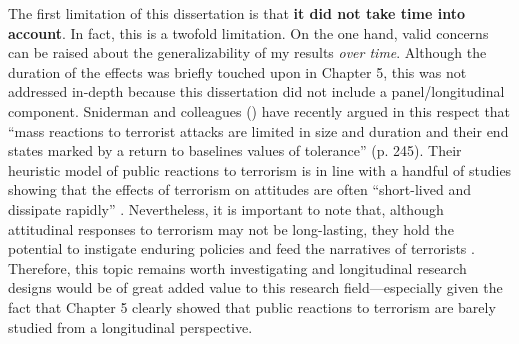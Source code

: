 The first limitation of this dissertation is that \textbf{it did not take time into account}. In fact, this is a twofold limitation. On the one hand, valid concerns can be raised about the generalizability of my results \textit{over time}. Although the duration of the effects was briefly touched upon in Chapter 5, this was not addressed in-depth because this dissertation did not include a panel/longitudinal component. Sniderman and colleagues (\citeyear{Sniderman2019a}) have recently argued in this respect that ``mass reactions to terrorist attacks are limited in size and duration and their end states marked by a return to baselines values of tolerance'' (p. 245). Their heuristic model of public reactions to terrorism is in line with a handful of studies showing that the effects of terrorism on attitudes are often ``short-lived and dissipate rapidly'' \citep[p.~231; see also Dinesen et al., \citeyear{Dinesen2013a}; Economou \& Kollias, \citeyear{Economou2019}]{Arvanitidis2016}. Nevertheless, it is important to note that, although attitudinal responses to terrorism may not be long-lasting, they hold the potential to instigate enduring policies \citep[such as the PATRIOT ACT; see also][]{Tomz2019} and feed the narratives of terrorists \citep{Bail2018}. Therefore, this topic remains worth investigating and longitudinal research designs would be of great added value to this research field---especially given the fact that Chapter 5 clearly showed that public reactions to terrorism are barely studied from a longitudinal perspective. 


